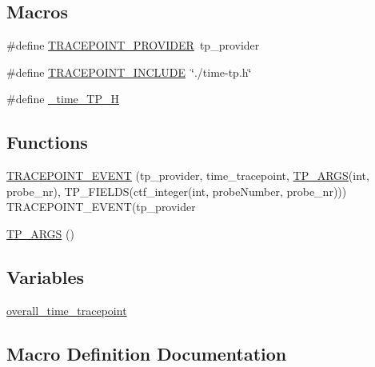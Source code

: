 \subsection*{Macros}
\begin{DoxyCompactItemize}
\item 
\#define \hyperlink{time-tp_8h_a6751837690af3a0ad19fb209a69dd16e}{T\+R\+A\+C\+E\+P\+O\+I\+N\+T\+\_\+\+P\+R\+O\+V\+I\+D\+ER}~tp\+\_\+provider
\item 
\#define \hyperlink{time-tp_8h_a090261faa16d05fb6993d61861ba8ff9}{T\+R\+A\+C\+E\+P\+O\+I\+N\+T\+\_\+\+I\+N\+C\+L\+U\+DE}~\char`\"{}./time-\/tp.\+h\char`\"{}
\item 
\#define \hyperlink{time-tp_8h_ad91ef7d5cc408393bcfaf376512d4ce7}{\+\_\+time\+\_\+\+T\+P\+\_\+H}
\end{DoxyCompactItemize}
\subsection*{Functions}
\begin{DoxyCompactItemize}
\item 
\hyperlink{time-tp_8h_ae23da3516b0a9868651c7da43c8d6a61}{T\+R\+A\+C\+E\+P\+O\+I\+N\+T\+\_\+\+E\+V\+E\+NT} (tp\+\_\+provider, time\+\_\+tracepoint, \hyperlink{time-tp_8h_a369ab506413cfc785534f5fb47faa636}{T\+P\+\_\+\+A\+R\+GS}(int, probe\+\_\+nr), T\+P\+\_\+\+F\+I\+E\+L\+DS(ctf\+\_\+integer(int, probe\+Number, probe\+\_\+nr))) T\+R\+A\+C\+E\+P\+O\+I\+N\+T\+\_\+\+E\+V\+E\+NT(tp\+\_\+provider
\item 
\hyperlink{time-tp_8h_a369ab506413cfc785534f5fb47faa636}{T\+P\+\_\+\+A\+R\+GS} ()
\end{DoxyCompactItemize}
\subsection*{Variables}
\begin{DoxyCompactItemize}
\item 
\hyperlink{time-tp_8h_ab28129dca0cec2a82e678cd4c60216dc}{overall\+\_\+time\+\_\+tracepoint}
\end{DoxyCompactItemize}


\subsection{Macro Definition Documentation}
\mbox{\label{time-tp_8h_ad91ef7d5cc408393bcfaf376512d4ce7}} 
